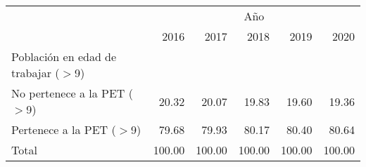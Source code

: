 \begin{tabular}{llllll}
\cline{1-6}
\multicolumn{1}{c}{} &
  \multicolumn{5}{|c}{Año} \\
\multicolumn{1}{c}{} &
  \multicolumn{1}{|r}{2016} &
  \multicolumn{1}{r}{2017} &
  \multicolumn{1}{r}{2018} &
  \multicolumn{1}{r}{2019} &
  \multicolumn{1}{r}{2020} \\
\cline{1-6}
\multicolumn{1}{l}{Población en edad de trabajar ($>$9)} &
  \multicolumn{1}{|r}{} &
  \multicolumn{1}{r}{} &
  \multicolumn{1}{r}{} &
  \multicolumn{1}{r}{} &
  \multicolumn{1}{r}{} \\
\multicolumn{1}{l}{\hspace{1em}No pertenece a la PET ($>$9)} &
  \multicolumn{1}{|r}{20.32} &
  \multicolumn{1}{r}{20.07} &
  \multicolumn{1}{r}{19.83} &
  \multicolumn{1}{r}{19.60} &
  \multicolumn{1}{r}{19.36} \\
\multicolumn{1}{l}{\hspace{1em}Pertenece a la PET ($>$9)} &
  \multicolumn{1}{|r}{79.68} &
  \multicolumn{1}{r}{79.93} &
  \multicolumn{1}{r}{80.17} &
  \multicolumn{1}{r}{80.40} &
  \multicolumn{1}{r}{80.64} \\
\multicolumn{1}{l}{\hspace{1em}Total} &
  \multicolumn{1}{|r}{100.00} &
  \multicolumn{1}{r}{100.00} &
  \multicolumn{1}{r}{100.00} &
  \multicolumn{1}{r}{100.00} &
  \multicolumn{1}{r}{100.00} \\
\cline{1-6}
\end{tabular}
